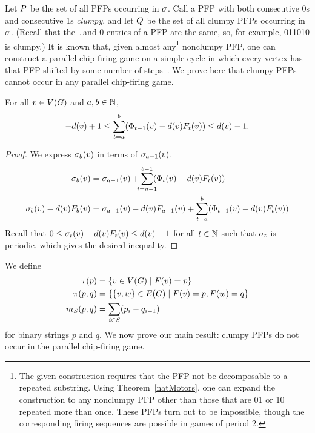 Let $\pfps$ be the set of all PFPs occurring in $\s$. Call a PFP with both
consecutive 0s and consecutive 1s \emph{clumpy}, and let $\cpfps$ be the set of
all clumpy PFPs occurring in $\s$. (Recall that the $\period$\xth and 0\xth
entries of a PFP are the same, so, for example, 011010 is clumpy.) It is known
that, given almost any\footnote{The given construction requires that the PFP
  not be decomposable to a repeated substring. Using Theorem~\ref{natMotors},
  one can expand the construction to any nonclumpy PFP other than those that
  are 01 or 10 repeated more than once. These PFPs turn out to be impossible,
  though the corresponding firing sequences are possible in games of period 2.}
nonclumpy PFP, one can construct a parallel chip-firing game on a simple cycle
in which every vertex has that PFP shifted by some number of
steps~\cite{cycle}. We prove here that clumpy PFPs cannot occur in any parallel
chip-firing game.

\begin{lem}\label{strongbg}
For all $v \in \V$ and $a, b \in \nats$,
\begin{equation}\label{local}
  -\deg{v} + 1 \leq \sum_{t=a}^{b}(\receiving{v}{t-1} - \deg{v}\firing{v}{t})
  \leq \deg{v}-1.
\end{equation}
\end{lem}

\begin{proof}
We express $\chips{v}{b}$ in terms of $\chips{v}{a-1}$.
\begin{align*}
  \chips{v}{b} &= \chips{v}{a-1} +
  \smashoperator{\sum_{t=a-1}}^{b-1}(\receiving{v}{t} - \deg{v}\firing{v}{t})
  \\
  \chips{v}{b} - \deg{v}\firing{v}{b} &= \chips{v}{a-1} -
  \deg{v}\firing{v}{a-1} + \sum_{t=a}^{b}(\receiving{v}{t-1} -
  \deg{v}\firing{v}{t})
\end{align*}
Recall that $0 \leq \chips{v}{t} - \deg{v}\firing{v}{t} \leq \deg{v} - 1$ for
all $t \in \nats$ such that $\pos{t}$ is periodic, which gives the desired
inequality.
\end{proof}

We define
\begin{align*}
\pfpverts{p} &= {\set{v \in \V}{\pfp{v}=p}} \\
\pfpedges{p}{q} &= {\set{\{v,w\} \in \E}{\pfp{v}=p, \pfp{w} = q}} \\
\misb{S}{p}{q} &= \sum_{i \in S}(p_{i} - q_{i-1})
\end{align*}
for binary strings $p$ and $q$. We now prove our main result: clumpy PFPs do
not occur in the parallel chip-firing game.

